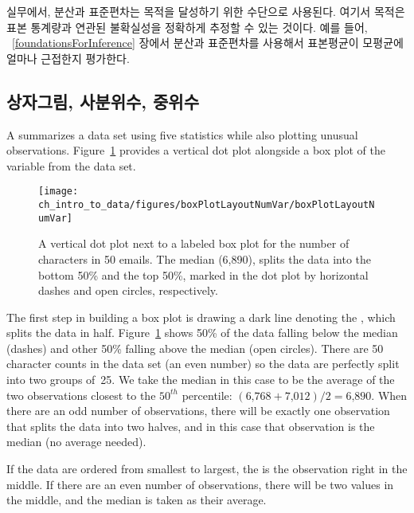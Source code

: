 실무에서, 분산과 표준편차는 목적을 달성하기 위한 수단으로 사용된다. 
여기서 목적은 표본 통계량과 연관된 불확실성을 정확하게 추정할 수 있는 것이다.
예를 들어, ~\ref{foundationsForInference} 장에서 분산과 표준편차를 사용해서 표본평균이 모평균에 얼마나 근접한지 평가한다.

\subsection{상자그림, 사분위수, 중위수}

A  summarizes a data set using five statistics while also plotting unusual observations. Figure~\ref{boxPlotLayoutNumVar} provides a vertical dot plot alongside a box plot of the  variable from the  data set.

\begin{figure}[h]
   \centering
   \texttt{[image: ch\_intro\_to\_data/figures/boxPlotLayoutNumVar/boxPlotLayoutNumVar]}
   \caption{A vertical dot plot next to a labeled box plot for the number of characters in 50 emails. The median (6,890), splits the data into the bottom 50\% and the top 50\%, marked in the dot plot by horizontal dashes and open circles, respectively.}
   \label{boxPlotLayoutNumVar}
\end{figure}

The first step in building a box plot is drawing a dark line denoting the , which splits the data in half. Figure~\ref{boxPlotLayoutNumVar} shows 50\% of the data falling below the median (dashes) and other 50\% falling above the median (open circles). There are 50 character counts in the data set (an even number) so the data are perfectly split into two groups of~25. We take the median in this case to be the average of the two observations closest to the $50^{th}$ percentile: $(\text{6,768} + \text{7,012}) / 2 = \text{6,890}$. When there are an odd number of observations, there will be exactly one observation that splits the data into two halves, and in this case that observation is the median (no average needed).

\begin{termBox}{
If the data are ordered from smallest to largest, the  is the observation right in the middle. If there are an even number of observations, there will be two values in the middle, and the median is taken as their average.}
\end{termBox}

